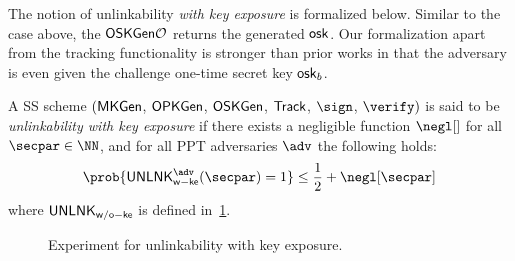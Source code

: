 The notion of unlinkability \emph{with key exposure} is formalized below. Similar to the case above, the $\mathsf{OSKGen}\mathcal{O}$ returns the generated $\mathsf{osk}$. Our formalization apart from the tracking functionality is stronger than prior works in that the adversary is even given the challenge one-time secret key $\mathsf{osk}_b$.

\begin{definition}
\label{def:unlink-with-key}
A SS scheme $(\mathsf{MKGen}$, $\mathsf{OPKGen}$, $\mathsf{OSKGen}$, $\mathsf{Track}$, $\sign$, $\verify)$  is said to be \emph{unlinkability with key exposure} if there exists a negligible function $\negl[]$ for all $\secpar \in \NN$, and for all PPT adversaries $\adv$ the following holds:
\[ \prob{\unlinkwke^\adv (\secpar)=1} \le \frac{1}{2} + \negl[\secpar]\]
where $\mathsf{UNLNK}_\mathsf{w/o-ke}$ is defined in~\cref{fig:experiment_unlink_with_key_exposure}.
\end{definition}

\begin{figure}[!t]
    \centering
    \begin{pchstack}[boxed]
    
    \pchspace
    \begin{pcvstack}
        
    \end{pcvstack}
    \end{pchstack}
    \caption{\small Experiment for unlinkability with key exposure.}
    \label{fig:experiment_unlink_with_key_exposure}
\end{figure}

